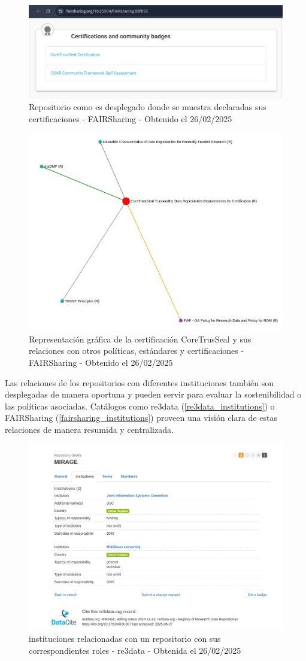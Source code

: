 \documentclass[runningheads]{llncs}
\begin{document}
\begin{figure}
    \centering
    \includegraphics[width=0.5\linewidth]{fairsharing_certified_repo.png}
    \caption{Repositorio como es desplegado donde se muestra declaradas sus certificaciones - FAIRSharing - Obtenido el 26/02/2025}
    \label{fig:fairsharing_certified_repo}
\end{figure}

\begin{figure}
    \centering
    \includegraphics[width=0.5\linewidth]{certificates_relations.png}
    \caption{Representación gráfica de la certificación CoreTrusSeal y sus relaciones con otros políticas, estándares y certificaciones - FAIRSharing - Obtenido el 26/02/2025}
    \label{fig:certificates_relations}
\end{figure}

Las relaciones de los repositorios con diferentes instituciones también son desplegadas de manera oportuna y pueden servir para evaluar la sostenibilidad o las políticas asociadas. Catálogos como re3data (\ref{re3data_institutions}) o FAIRSharing (\ref{fairsharing_institutions}) proveen una visión clara de estas relaciones de manera resumida y centralizada.\\

\begin{figure}
    \centering
    \includegraphics[width=0.5\linewidth]{re3data_institutions.png}
    \caption{instituciones relacionadas con un repositorio con sus correspondientes roles - re3data - Obtenida el 26/02/2025}
    \label{fig:re3data_institutions}
\end{figure}
\end{document}
